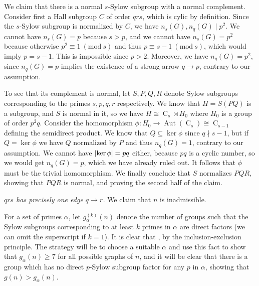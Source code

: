 \documentclass{article}
\DeclarePairedDelimiter\abs{\lvert}{\rvert}
\newcommand{\aut}[1]{\operatorname{Aut}(#1)}
\newcommand{\cyc}[1]{\operatorname{C}_{#1}}
\newcommand{\Mod}[1]{\ (\mathrm{mod} \ #1)}
\theoremstyle{plain}
\theoremstyle{definition}
\begin{document}
We claim that there is a normal $s$-Sylow subgroup with a normal complement. Consider first a Hall subgroup $C$ of order $qrs$, which is cylic by definition. Since the $s$-Sylow subgroup is normalized by $C$, we have $n_s(G), n_q(G) \mid p^2$. We cannot have $n_s(G) = p$ because $s > p$, and we cannot have $n_s(G) = p^2$ because otherwise $p^2 \equiv 1 \Mod{s}$ and thus $p \equiv s - 1 \Mod{s}$, which would imply $p = s - 1$. This is impossible since $p > 2$. Moreover, we have $n_q(G) = p^2$, since $n_q(G) = p$ implies the existence of a strong arrow $q \rightarrow p$, contrary to our assumption.

To see that its complement is normal, let $S, P, Q, R$ denote Sylow subgroups corresponding to the primes $s, p, q, r$ respectively. We know that $H = S(PQ)$ is a subgroup, and $S$ is normal in it, so we have $H \cong \cyc{s} \rtimes H_0$ where $H_0$ is a group of order $p^2 q$. Consider the homomorphism $\phi : H_0 \rightarrow \aut{\cyc{s}} \cong \cyc{s - 1}$ defining the semidirect product. We know that $Q \subseteq \ker \phi$ since $q \nmid s - 1$, but if $Q = \ker \phi$ we have $Q$ normalized by $P$ and thus $n_q(G) = 1$, contrary to our assumption. We cannot have $\abs{\ker \phi} = pq$ either, because $pq$ is a cyclic number, so we would get $n_q(G) = p$, which we have already ruled out. It follows that $\phi$ must be the trivial homomorphism. We finally conclude that $S$ normalizes $PQR$, showing that $PQR$ is normal, and proving the second half of the claim.

 \emph{$qrs$ has precisely one edge $q \rightarrow r$.} We claim that $n$ is inadmissible.\nopagebreak

For a set of primes $\alpha$, let $g^{(k)}_\alpha(n)$ denote the number of groups such that the Sylow subgroups corresponding to at least $k$ primes in $\alpha$ are direct factors (we can omit the superscript if $k = 1$). It is clear that , by the inclusion-exclusion principle. The strategy will be to choose a suitable $\alpha$ and use this fact to show that $g_\alpha(n) \ge 7$ for all possible graphs of $n$, and it will be clear that there is a group which has no direct $p$-Sylow subgroup factor for any $p$ in $\alpha$, showing that $g(n) > g_\alpha(n)$.
\end{document}
